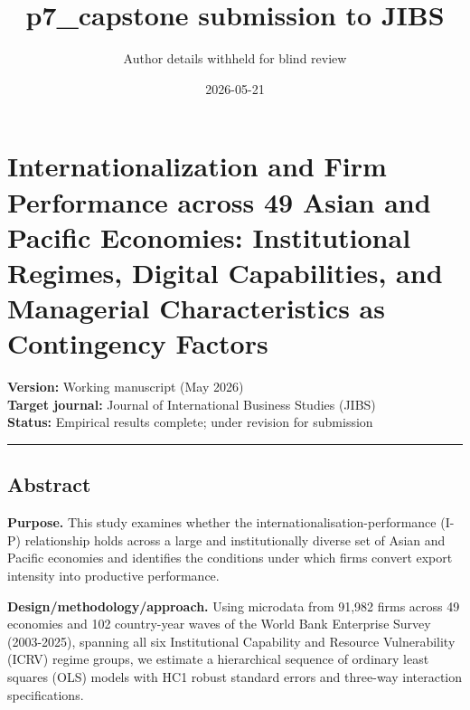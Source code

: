 \documentclass[12pt,a4paper]{article}
\title{p7\_capstone submission to JIBS}
\author{Author details withheld for blind review}
\date{2026-05-21}
\begin{document}
\maketitle

\hypertarget{internationalization-and-firm-performance-across-49-asian-and-pacific-economies-institutional-regimes-digital-capabilities-and-managerial-characteristics-as-contingency-factors}{%
\section{Internationalization and Firm Performance across 49 Asian and
Pacific Economies: Institutional Regimes, Digital Capabilities, and
Managerial Characteristics as Contingency
Factors}\label{internationalization-and-firm-performance-across-49-asian-and-pacific-economies-institutional-regimes-digital-capabilities-and-managerial-characteristics-as-contingency-factors}}

\textbf{Version:} Working manuscript (May 2026)\\
\textbf{Target journal:} Journal of International Business Studies
(JIBS)\\
\textbf{Status:} Empirical results complete; under revision for
submission

\begin{center}\rule{0.5\linewidth}{0.5pt}\end{center}

\hypertarget{abstract}{%
\subsection{Abstract}\label{abstract}}

\textbf{Purpose.} This study examines whether the
internationalisation-performance (I-P) relationship holds across a large
and institutionally diverse set of Asian and Pacific economies and
identifies the conditions under which firms convert export intensity
into productive performance.

\textbf{Design/methodology/approach.} Using microdata from 91,982 firms
across 49 economies and 102 country-year waves of the World Bank
Enterprise Survey (2003-2025), spanning all six Institutional Capability
and Resource Vulnerability (ICRV) regime groups, we estimate a
hierarchical sequence of ordinary least squares (OLS) models with HC1
robust standard errors and three-way interaction specifications.
\end{document}
